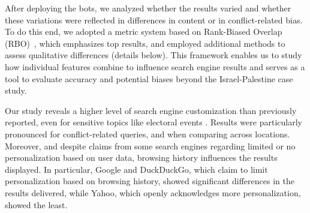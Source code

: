  After deploying the bots, we analyzed whether the results varied and whether these variations were reflected in differences in content or in conflict-related bias. To do this end, we adopted a metric system based on Rank-Biased Overlap (RBO)~\cite{rank_biased_precision_measurement}, which emphasizes top results, and employed additional methods to assess qualitative differences (details below). This framework enables us to study how individual features combine to influence search engine results and serves as a tool to evaluate accuracy and potential biases beyond the Israel-Palestine case study.

 Our study reveals a higher level of search engine customization than previously reported, even for sensitive topics like electoral events \cite{haim2017burst, krafft2019search_engine_manipulation, partisan_audience_bias}. Results were particularly pronounced for conflict-related queries, and when comparing across locations. Moreover, and despite claims from some search engines regarding limited or no personalization based on user data, browsing history influences the results displayed. In particular, Google and DuckDuckGo, which claim to limit personalization based on browsing history, showed significant differences in the results delivered, while Yahoo, which openly acknowledges more personalization, showed the least.





